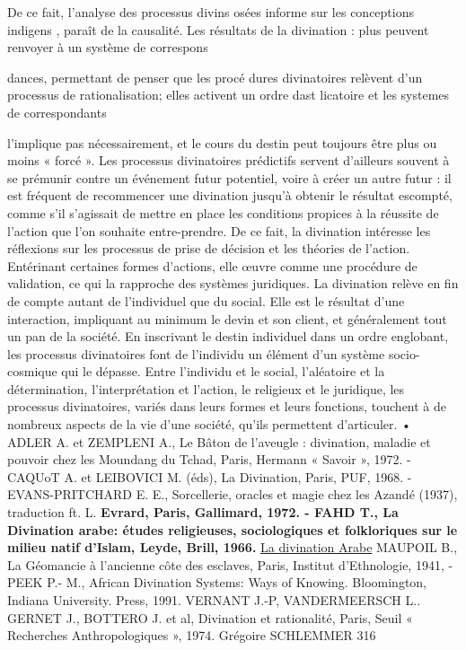 De ce fait, l'analyse des processus divins osées   informe sur les conceptions indigens
 , paraît
de la causalité. Les résultats de la divination
: plus peuvent renvoyer à un système de correspons
 
dances, permettant de penser que les procé
dures divinatoires relèvent d'un processus de rationalisation; elles activent un ordre dast licatoire et les systemes de correspondants


l'implique pas nécessairement, et le cours du destin peut toujours être plus ou moins « forcé ». Les processus divinatoires prédictifs servent d'ailleurs souvent à se prémunir contre un événement futur potentiel, voire à créer un autre futur : il est fréquent de recommencer une divination jusqu'à obtenir le résultat escompté, comme s'il s'agissait de mettre en place les conditions propices à la réussite de l'action que l'on souhaite entre-prendre. De ce fait, la divination intéresse les réflexions sur les processus de prise de décision et les théories de l'action. Entérinant certaines formes d'actions, elle œuvre comme une procédure de validation, ce qui la rapproche des systèmes juridiques.
La divination relève en fin de compte autant de l'individuel que du social. Elle est le résultat d'une interaction, impliquant au minimum le devin et son client, et généralement tout un pan de la société. En inscrivant le destin individuel dans un ordre englobant, les processus divinatoires font de l'individu un élément d'un système socio-cosmique qui le dépasse. Entre l'individu et le social, l'aléatoire et la détermination, l'interprétation et l'action, le religieux et le juridique, les processus divinatoires, variés dans leurs formes et leurs fonctions, touchent à de nombreux aspects de la vie d'une société, qu'ils permettent d'articuler.
• ADLER A. et ZEMPLENI A., Le Bâton de l'aveugle : divination, maladie et pouvoir chez les Moundang du Tchad, Paris, Hermann « Savoir », 1972. - CAQUoT A.
et LEIBOVICI M. (éds), La Divination, Paris, PUF,
1968. - EVANS-PRITCHARD E. E., Sorcellerie, oracles et magie chez les Azandé (1937), traduction ft. L.
\textbf{Evrard, Paris, Gallimard, 1972. - FAHD T., La Divination arabe: études religieuses, sociologiques et folkloriques sur le milieu natif d'Islam, Leyde, Brill, 1966.} \href{https://books.google.fr/books?id=ETsVAAAAIAAJ&lpg=PP1&hl=fr&pg=PA8#v=onepage&q&f=false}{La divination Arabe}
MAUPOIL B., La Géomancie à l'ancienne côte des esclaves, Paris, Institut d'Ethnologie, 1941, - PEEK P.-
M., African Divination Systems: Ways of Knowing.
Bloomington, Indiana University. Press, 1991.
VERNANT J.-P, VANDERMEERSCH L.. GERNET J., BOTTERO J. et al, Divination et rationalité, Paris, Seuil « Recherches Anthropologiques », 1974.
Grégoire SCHLEMMER
316



